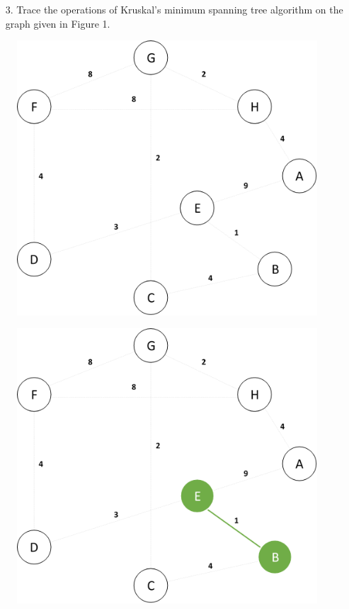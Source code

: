 \documentclass{article}
\begin{document}
\begin{enumerate}[leftmargin=\labelsep]
  \item[3.] Trace the operations of Kruskal's minimum spanning tree algorithm on the graph given in Figure 1.
\end{enumerate}

\begin{figure}[H]
\centering
\includegraphics[scale=0.6]{images/Q3/01.png}
\end{figure}

\begin{figure}[H]
\centering
\includegraphics[scale=0.6]{images/Q3/02.png}
\end{figure}
\end{document}
